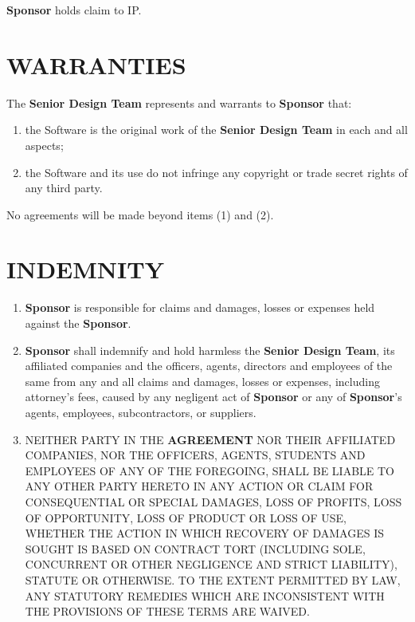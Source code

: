 \documentclass[11pt]{article}
\begin{document}
\textbf{Sponsor} holds claim to IP.

\section{WARRANTIES }  

The \textbf{Senior Design Team} represents and warrants to \textbf{Sponsor} that:         
\begin{enumerate}  \itemsep4pt \parskip0pt 
\item  the Software is the original work of the \textbf{Senior Design Team} in each and all aspects;        

\item the Software and its use do not infringe any copyright or   trade secret rights of any third party.  
\end{enumerate}
No agreements will be made beyond items (1) and (2).

\section{INDEMNITY}   
\begin{enumerate}  \itemsep4pt \parskip0pt 
\item \textbf{Sponsor} is responsible for claims and damages, losses or expenses held against the \textbf{Sponsor}.

\item  \textbf{Sponsor} shall       indemnify and hold harmless  the \textbf{Senior Design Team}, its affiliated companies       and the officers, agents, directors and employees of the same from       any and all claims and damages, losses or expenses, including       attorney's fees, caused by any negligent act of \textbf{Sponsor} or any of       \textbf{Sponsor}'s agents, employees, subcontractors, or suppliers.    

\item  NEITHER PARTY IN THE \textbf{AGREEMENT} NOR THEIR AFFILIATED COMPANIES,       NOR THE OFFICERS, AGENTS, STUDENTS AND EMPLOYEES OF ANY OF THE       FOREGOING, SHALL BE LIABLE TO ANY OTHER PARTY HERETO IN ANY ACTION       OR CLAIM FOR CONSEQUENTIAL OR SPECIAL DAMAGES, LOSS OF PROFITS,       LOSS OF OPPORTUNITY, LOSS OF PRODUCT OR LOSS OF USE, WHETHER THE       ACTION IN WHICH RECOVERY OF DAMAGES IS SOUGHT IS BASED ON CONTRACT       TORT (INCLUDING SOLE, CONCURRENT OR OTHER NEGLIGENCE AND STRICT       LIABILITY), STATUTE OR OTHERWISE. TO THE EXTENT PERMITTED BY LAW,       ANY STATUTORY REMEDIES WHICH ARE INCONSISTENT WITH THE PROVISIONS       OF THESE TERMS ARE WAIVED.  
\end{enumerate}
\end{document}
